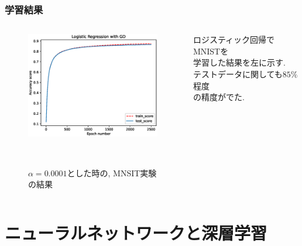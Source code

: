\documentclass[dvipdfmx,11pt]{beamer}		%
\begin{document}
    \begin{frame}
        \frametitle{学習結果}
        \begin{columns}[t]
            \begin{column}{0.65\textwidth} 
                \begin{figure}
                    \centering
                    \includegraphics[width = 6.8cm]{Image/MNIST_Experiment.eps}
                    \caption{$\alpha = 0.0001$とした時の, MNSIT実験の結果}
              　\end{figure}
            \end{column}
            \begin{column}{0.75\textwidth}
                ロジスティック回帰でMNISTを\\
                学習した結果を左に示す. \\
                テストデータに関しても$85\%$程度\\
                の精度がでた. 
            \end{column}
        \end{columns}
    \end{frame}
    \section{ニューラルネットワークと深層学習}
\end{document}
